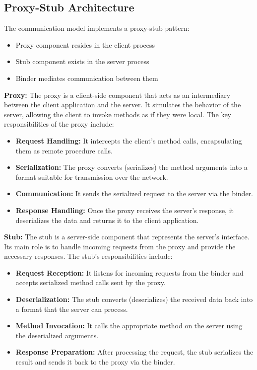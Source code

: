 \documentclass{article}
\begin{document}
\subsection{Proxy-Stub Architecture}
The communication model implements a proxy-stub pattern:
\begin{itemize}
    \item Proxy component resides in the client process
    \item Stub component exists in the server process
    \item Binder mediates communication between them
\end{itemize}

\textbf{Proxy:} The proxy is a client-side component that acts as an intermediary between the client application and the server. It simulates the behavior of the server, allowing the client to invoke methods as if they were local. The key responsibilities of the proxy include:
\begin{itemize}
    \item \textbf{Request Handling:} It intercepts the client's method calls, encapsulating them as remote procedure calls.
    \item \textbf{Serialization:} The proxy converts (serializes) the method arguments into a format suitable for transmission over the network.
    \item \textbf{Communication:} It sends the serialized request to the server via the binder.
    \item \textbf{Response Handling:} Once the proxy receives the server's response, it deserializes the data and returns it to the client application.
\end{itemize}

\textbf{Stub:} The stub is a server-side component that represents the server's interface. Its main role is to handle incoming requests from the proxy and provide the necessary responses. The stub's responsibilities include:
\begin{itemize}
    \item \textbf{Request Reception:} It listens for incoming requests from the binder and accepts serialized method calls sent by the proxy.
    \item \textbf{Deserialization:} The stub converts (deserializes) the received data back into a format that the server can process.
    \item \textbf{Method Invocation:} It calls the appropriate method on the server using the deserialized arguments.
    \item \textbf{Response Preparation:} After processing the request, the stub serializes the result and sends it back to the proxy via the binder.
\end{itemize}
\end{document}
